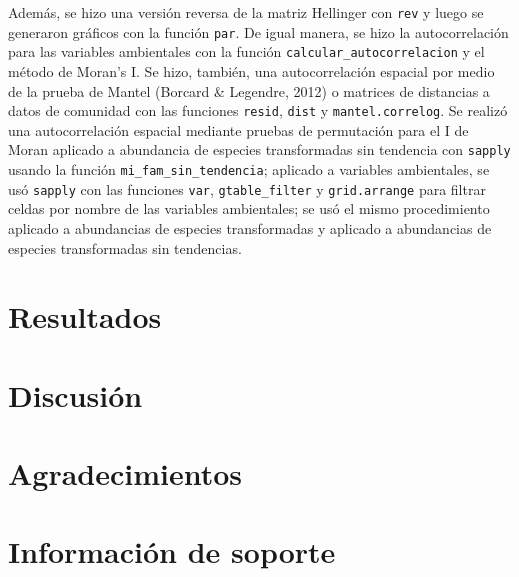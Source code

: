 \documentclass[11pt,]{article}
\begin{document}
Además, se hizo una versión reversa de la matriz Hellinger con
\texttt{rev} y luego se generaron gráficos con la función \texttt{par}.
De igual manera, se hizo la autocorrelación para las variables
ambientales con la función \texttt{calcular\_autocorrelacion} y el
método de Moran's I. Se hizo, también, una autocorrelación espacial por
medio de la prueba de Mantel (Borcard \& Legendre, 2012) o matrices de
distancias a datos de comunidad con las funciones \texttt{resid},
\texttt{dist} y \texttt{mantel.correlog}. Se realizó una autocorrelación
espacial mediante pruebas de permutación para el I de Moran aplicado a
abundancia de especies transformadas sin tendencia con \texttt{sapply}
usando la función \texttt{mi\_fam\_sin\_tendencia}; aplicado a variables
ambientales, se usó \texttt{sapply} con las funciones \texttt{var},
\texttt{gtable\_filter} y \texttt{grid.arrange} para filtrar celdas por
nombre de las variables ambientales; se usó el mismo procedimiento
aplicado a abundancias de especies transformadas y aplicado a
abundancias de especies transformadas sin tendencias.

\section{Resultados}\label{resultados}

\section{Discusión}\label{discusiuxf3n}

\section{Agradecimientos}\label{agradecimientos}

\section{Información de soporte}\label{informaciuxf3n-de-soporte}
\end{document}

